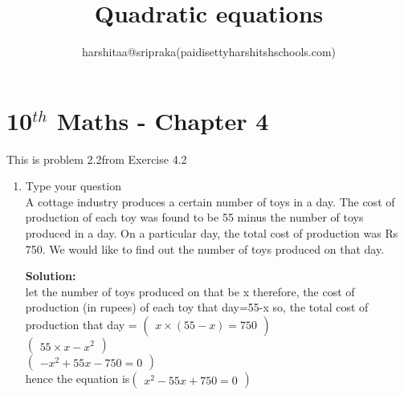\documentclass[12pt]{article}
\title{Quadratic equations}
\author{harshitaa@sripraka(paidisettyharshitshschools.com)}
\newcommand{\myvec}[1]{\ensuremath{\begin{pmatrix}#1\end{pmatrix}}}
\newcommand{\solution}{\noindent \textbf{Solution: }}
\begin{document}
\maketitle
\section*{10$^{th}$ Maths - Chapter 4}
This is problem 2.2from Exercise 4.2
\begin{enumerate}
\item Type your question \\
 A cottage industry produces a certain number of toys in a day. The cost of production of each  toy was found to be 55 minus the number of toys produced in a day. On a particular day, the total cost of production was Rs 750. We would like to find out the number of toys produced on that day.
 
\solution\\
let the number of toys produced on that be x
therefore, the cost of production (in rupees) of each toy that day=55-x
so, the total cost of production that day =
\myvec{{x\times(55-x)}=750}\\
\myvec{55\times x-x^2}\\
\myvec{-x^2+55x-750=0}\\
 hence the equation is\myvec{x^2-55x+750=0}\\

\end{enumerate}
\end{document}
